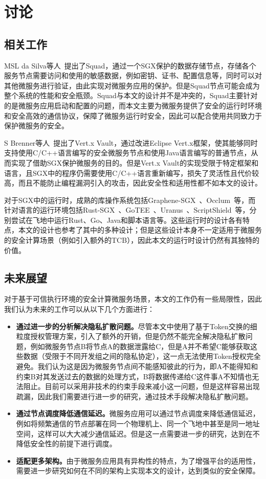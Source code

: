 \section{讨论}\label{sec:discussion}

\subsection{相关工作}

MSL da Silva等人~\cite{}提出了Squad，通过一个SGX保护的数据存储节点，存储各个服务节点需要访问和使用的敏感数据，例如密钥、证书、配置信息等，同时可以对其他微服务进行验证，由此实现对微服务应用的保护。但是Squad节点可能会成为整个系统的性能和安全瓶颈。Squad与本文的设计并不是冲突的，Squad主要针对的是微服务应用启动和配置的问题，而本文主要为微服务提供了安全的运行时环境和安全高效的通信协议，保障了微服务运行时安全，因此可以配合使用共同致力于保护微服务的安全。

S Brenner等人~\cite{}提出了Vert.x Vault，通过改进Eclipse Vert.x框架，使其能够同时支持使用C/C++语言编写的安全微服务节点和使用Java语言编写的普通节点，从而实现了借助SGX保护微服务的目的。但是Vert.x Vault的实现受限于特定框架和语言，且SGX中的程序仍需要使用C/C++语言重新编写，损失了灵活性且代价较高，而且不能防止编程漏洞引入的攻击，因此安全性和适用性都不如本文的设计。

对于SGX中的运行时，成熟的库操作系统包括Graphene-SGX~\cite{}、Occlum~\cite{}等，而针对语言的运行环境包括Rust-SGX~\cite{}、GoTEE~\cite{}、Uranus~\cite{}、ScriptShield~\cite{}等，分别尝试在飞地中运行Rust、Go、Java和脚本语言等。这些运行时的设计各有特点，本文的设计也参考了其中的多种设计；但是这些设计本身不一定适用于微服务的安全计算场景（例如引入额外的TCB），因此本文的运行时设计仍然有其独特的价值。

\subsection{未来展望}

对于基于可信执行环境的安全计算微服务场景，本文的工作仍有一些局限性，因此我们认为未来的工作可以从以下几个方面进行：

\begin{itemize}
    \item \textbf{通过进一步的分析解决隐私扩散问题。}尽管本文中使用了基于Token交换的细粒度授权管理方案，引入了额外的开销，但是仍然不能完全解决隐私扩散问题，例如微服务节点B将节点A的数据泄露给C，但是A并不希望C能够获取这些数据（受限于不同开发组之间的隐私协定），这一点无法使用Token授权完全避免。我们认为这是因为微服务节点间不能感知彼此的行为，即A不能得知和约束B对其发送过去的数据的处理方式，B将数据传递给C这件事A不知情也无法阻止。目前可以采用非技术的约束手段来减小这一问题，但是这样容易出现疏漏，因此我们需要进行进一步的研究，通过技术手段解决隐私扩散问题。
    \item \textbf{通过节点调度降低通信延迟。}微服务应用可以通过节点调度来降低通信延迟，例如将频繁通信的节点部署在同一个物理机上、同一个飞地中甚至是同一地址空间，这样可以大大减少通信延迟。但是这一点需要进一步的研究，达到在不降低安全性的前提下进行调度。
    \item \textbf{适配更多架构。}由于微服务应用具有异构性的特点，为了增强平台的适用性，需要进一步研究如何在不同的架构上实现本文的设计，达到类似的安全保障。
\end{itemize}
